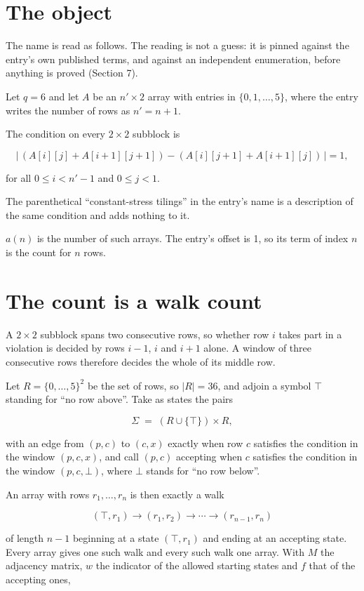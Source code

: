 \documentclass[11pt]{article}
\theoremstyle{definition}
\begin{document}
\section{The object}

The name is read as follows. The reading is not a guess: it is pinned against the entry's own published terms, and against an independent enumeration, before anything is proved (Section 7).

Let $q = 6$ and let $A$ be an $n' \times 2$ array with entries in $\{0,1,\dots,5\}$, where the entry writes the number of rows as $n' = n + 1$.

The condition on every $2 \times 2$ subblock is

\[\bigl|\,(A[i][j] + A[i{+}1][j{+}1]) - (A[i][j{+}1] + A[i{+}1][j])\,\bigr| = 1,\]

for all $0 \le i < n'-1$ and $0 \le j < 1$.

The parenthetical ``constant-stress tilings'' in the entry's name is a description of the same condition and adds nothing to it.

$a(n)$ is the number of such arrays. The entry's offset is 1, so its term of index $n$ is the count for $n$ rows.

\section{The count is a walk count}

A $2 \times 2$ subblock spans two consecutive rows, so whether row $i$ takes part in a violation is decided by rows $i-1$, $i$ and $i+1$ alone. A window of three consecutive rows therefore decides the whole of its middle row.

Let $R = \{0,\dots,5\}^{2}$ be the set of rows, so $|R| = 36$, and adjoin a symbol $\top$ standing for ``no row above''. Take as states the pairs

\[\Sigma \;=\; (R \cup \{\top\}) \times R,\]

with an edge from $(p,c)$ to $(c,x)$ exactly when row $c$ satisfies the condition in the window $(p,c,x)$, and call $(p,c)$ accepting when $c$ satisfies the condition in the window $(p,c,\bot)$, where $\bot$ stands for ``no row below''.

An array with rows $r_1,\dots,r_n$ is then exactly a walk

\[(\top,r_1) \to (r_1,r_2) \to \cdots \to (r_{n-1},r_n)\]

of length $n-1$ beginning at a state $(\top,r_1)$ and ending at an accepting state. Every array gives one such walk and every such walk one array. With $M$ the adjacency matrix, $w$ the indicator of the allowed starting states and $f$ that of the accepting ones,
\end{document}
